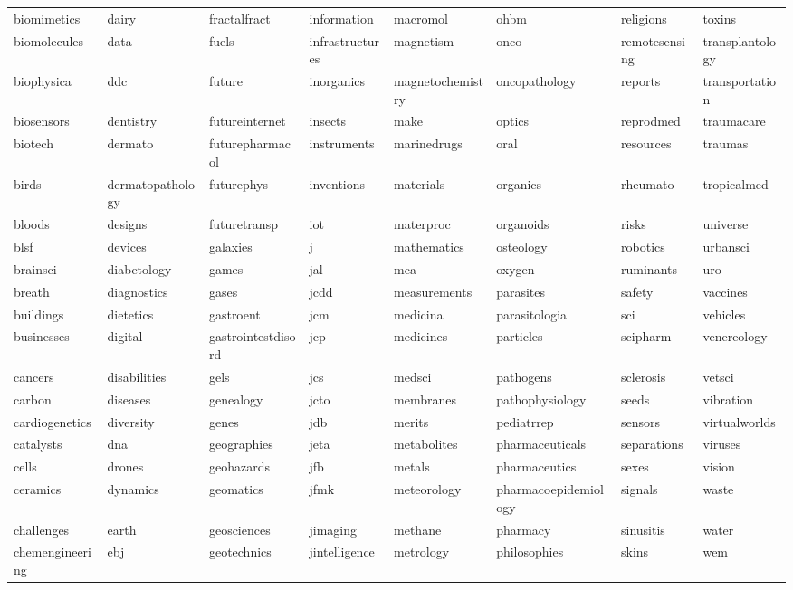 \documentclass[atmosphere,article,submit,moreauthors,pdftex]{Definitions/mdpi}
\begin{document}
\begin{longtable}[t]{llllllll}
biomimetics & dairy & fractalfract & information & macromol & ohbm & religions & toxins\\
\addlinespace
biomolecules & data & fuels & infrastructures & magnetism & onco & remotesensing & transplantology\\
biophysica & ddc & future & inorganics & magnetochemistry & oncopathology & reports & transportation\\
biosensors & dentistry & futureinternet & insects & make & optics & reprodmed & traumacare\\
biotech & dermato & futurepharmacol & instruments & marinedrugs & oral & resources & traumas\\
birds & dermatopathology & futurephys & inventions & materials & organics & rheumato & tropicalmed\\
\addlinespace
bloods & designs & futuretransp & iot & materproc & organoids & risks & universe\\
blsf & devices & galaxies & j & mathematics & osteology & robotics & urbansci\\
brainsci & diabetology & games & jal & mca & oxygen & ruminants & uro\\
breath & diagnostics & gases & jcdd & measurements & parasites & safety & vaccines\\
buildings & dietetics & gastroent & jcm & medicina & parasitologia & sci & vehicles\\
\addlinespace
businesses & digital & gastrointestdisord & jcp & medicines & particles & scipharm & venereology\\
cancers & disabilities & gels & jcs & medsci & pathogens & sclerosis & vetsci\\
carbon & diseases & genealogy & jcto & membranes & pathophysiology & seeds & vibration\\
cardiogenetics & diversity & genes & jdb & merits & pediatrrep & sensors & virtualworlds\\
catalysts & dna & geographies & jeta & metabolites & pharmaceuticals & separations & viruses\\
\addlinespace
cells & drones & geohazards & jfb & metals & pharmaceutics & sexes & vision\\
ceramics & dynamics & geomatics & jfmk & meteorology & pharmacoepidemiology & signals & waste\\
challenges & earth & geosciences & jimaging & methane & pharmacy & sinusitis & water\\
chemengineering & ebj & geotechnics & jintelligence & metrology & philosophies & skins & wem\\

\end{longtable}
\end{document}
